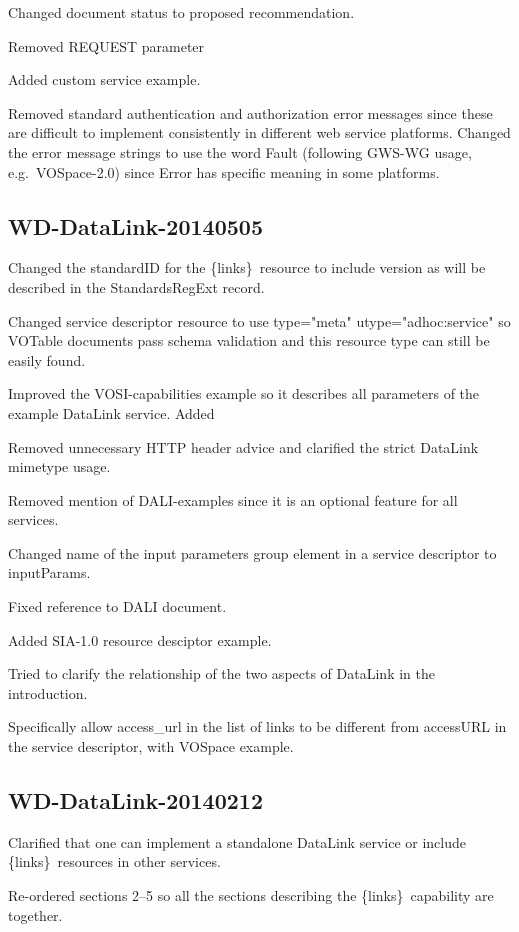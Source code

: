 \documentclass[11pt,a4paper]{ivoa}
\newcommand{\blinks}{\{links\}}
\begin{document}
Changed document status to proposed recommendation.

Removed REQUEST parameter

Added custom service example.

Removed standard authentication and authorization error messages since
these are difficult to implement consistently in different web service
platforms. Changed the error message strings to use the word Fault
(following GWS-WG usage, e.g.\ VOSpace-2.0) since Error has specific
meaning in some platforms.


\subsection{WD-DataLink-20140505}

Changed the standardID for the \blinks\ resource to include version as
will be described in the StandardsRegExt record.

Changed service descriptor resource to use
type="meta" utype="adhoc:service"
so VOTable documents pass schema validation and this resource type can
still be easily found.

Improved the VOSI-capabilities example so it describes all parameters
of the example DataLink service.
Added %

Removed unnecessary HTTP header advice and clarified the strict DataLink
mimetype usage.

Removed mention of DALI-examples since it is an optional feature for
all services.

Changed name of the input parameters group element in a service descriptor
to inputParams.

Fixed reference to DALI document.

Added SIA-1.0 resource desciptor example.

Tried to clarify the relationship of the two aspects of DataLink in
the introduction.

Specifically allow access\_url in the list of links to be different from
accessURL in the service descriptor, with VOSpace example.


\subsection{WD-DataLink-20140212}

Clarified that one can implement a standalone DataLink service or include
\blinks\ resources in other services.

Re-ordered sections 2--5 so all the sections describing the
\blinks\ capability are together.
\end{document}
